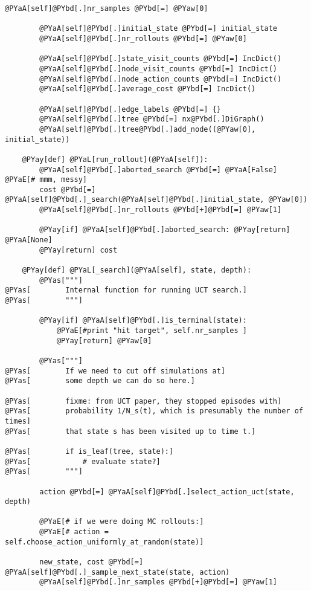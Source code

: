 \begin{Verbatim}[commandchars=@\[\]]
        @PYaA[self]@PYbd[.]nr_samples @PYbd[=] @PYaw[0]

        @PYaA[self]@PYbd[.]initial_state @PYbd[=] initial_state
        @PYaA[self]@PYbd[.]nr_rollouts @PYbd[=] @PYaw[0]

        @PYaA[self]@PYbd[.]state_visit_counts @PYbd[=] IncDict()
        @PYaA[self]@PYbd[.]node_visit_counts @PYbd[=] IncDict()
        @PYaA[self]@PYbd[.]node_action_counts @PYbd[=] IncDict()
        @PYaA[self]@PYbd[.]average_cost @PYbd[=] IncDict()

        @PYaA[self]@PYbd[.]edge_labels @PYbd[=] {}
        @PYaA[self]@PYbd[.]tree @PYbd[=] nx@PYbd[.]DiGraph()
        @PYaA[self]@PYbd[.]tree@PYbd[.]add_node((@PYaw[0], initial_state))

    @PYay[def] @PYaL[run_rollout](@PYaA[self]):
        @PYaA[self]@PYbd[.]aborted_search @PYbd[=] @PYaA[False] @PYaE[# mmm, messy]
        cost @PYbd[=] @PYaA[self]@PYbd[.]_search(@PYaA[self]@PYbd[.]initial_state, @PYaw[0])
        @PYaA[self]@PYbd[.]nr_rollouts @PYbd[+]@PYbd[=] @PYaw[1]

        @PYay[if] @PYaA[self]@PYbd[.]aborted_search: @PYay[return] @PYaA[None]
        @PYay[return] cost

    @PYay[def] @PYaL[_search](@PYaA[self], state, depth):
        @PYas["""]
@PYas[        Internal function for running UCT search.]
@PYas[        """]

        @PYay[if] @PYaA[self]@PYbd[.]is_terminal(state):
            @PYaE[#print "hit target", self.nr_samples ]
            @PYay[return] @PYaw[0]

        @PYas["""]
@PYas[        If we need to cut off simulations at]
@PYas[        some depth we can do so here.]

@PYas[        fixme: from UCT paper, they stopped episodes with]
@PYas[        probability 1/N_s(t), which is presumably the number of times]
@PYas[        that state s has been visited up to time t.]

@PYas[        if is_leaf(tree, state):]
@PYas[            # evaluate state?]
@PYas[        """]

        action @PYbd[=] @PYaA[self]@PYbd[.]select_action_uct(state, depth)

        @PYaE[# if we were doing MC rollouts:]
        @PYaE[# action = self.choose_action_uniformly_at_random(state)]

        new_state, cost @PYbd[=] @PYaA[self]@PYbd[.]_sample_next_state(state, action)
        @PYaA[self]@PYbd[.]nr_samples @PYbd[+]@PYbd[=] @PYaw[1]


\end{Verbatim}
